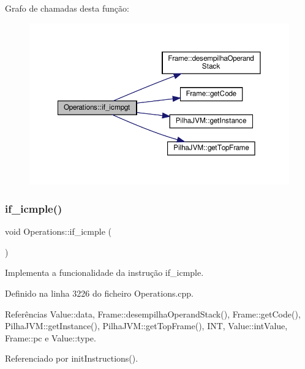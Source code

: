 Grafo de chamadas desta função\+:\nopagebreak
\begin{figure}[H]
\begin{center}
\leavevmode
\includegraphics[width=350pt]{classOperations_a40232532d2522ef0afe261555688a7fd_cgraph}
\end{center}
\end{figure}
\mbox{\label{classOperations_a7a5736e30fcd41a1bccb71c615c4e68d}} 
\subsubsection{\texorpdfstring{if\+\_\+icmple()}{if\_icmple()}}
{\footnotesize\ttfamily void Operations\+::if\+\_\+icmple (\begin{DoxyParamCaption}{ }\end{DoxyParamCaption})\hspace{0.3cm}{\ttfamily [private]}}



Implementa a funcionalidade da instrução if\+\_\+icmple. 



Definido na linha 3226 do ficheiro Operations.\+cpp.



Referências Value\+::data, Frame\+::desempilha\+Operand\+Stack(), Frame\+::get\+Code(), Pilha\+J\+V\+M\+::get\+Instance(), Pilha\+J\+V\+M\+::get\+Top\+Frame(), I\+NT, Value\+::int\+Value, Frame\+::pc e Value\+::type.



Referenciado por init\+Instructions().

